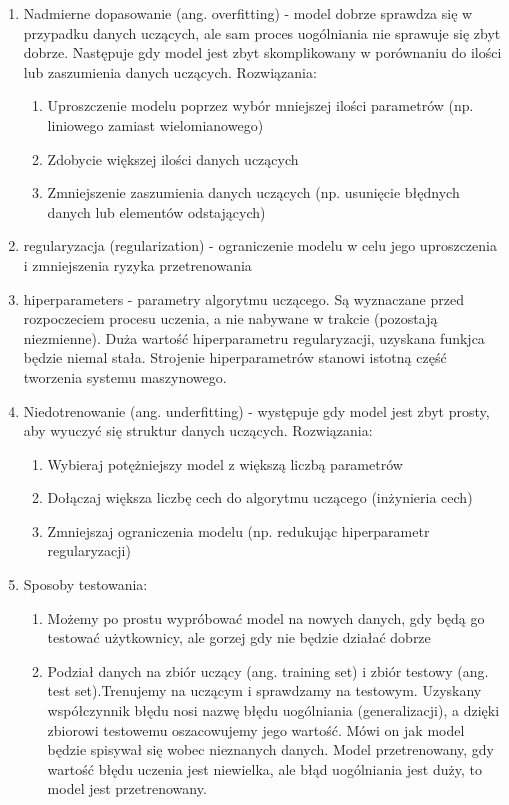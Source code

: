 \documentclass[polish,12pt,a4paper]{article}
\begin{document}
\begin{enumerate}
\begin{enumerate}
		\end{enumerate}
		\item Nadmierne dopasowanie (ang. overfitting) - model dobrze sprawdza się w przypadku danych uczących, ale sam proces uogólniania nie sprawuje się zbyt dobrze. Następuje gdy model jest zbyt skomplikowany w porównaniu do ilości lub zaszumienia danych uczących. Rozwiązania:
		\begin{enumerate}
			\item Uproszczenie modelu poprzez wybór mniejszej ilości parametrów (np. liniowego zamiast wielomianowego)
			\item Zdobycie większej ilości danych uczących
			\item Zmniejszenie zaszumienia danych uczących (np. usunięcie błędnych danych lub elementów odstających)
		\end{enumerate}
		\item regularyzacja (regularization) - ograniczenie modelu w celu jego uproszczenia i zmniejszenia ryzyka przetrenowania
		\item hiperparameters - parametry algorytmu uczącego. Są wyznaczane przed rozpoczeciem procesu uczenia, a nie nabywane w trakcie (pozostają niezmienne). Duża wartość hiperparametru regularyzacji, uzyskana funkjca będzie niemal stała. Strojenie hiperparametrów stanowi istotną część tworzenia systemu maszynowego.
		\item Niedotrenowanie (ang. underfitting) - występuje gdy model jest zbyt prosty, aby wyuczyć się struktur danych uczących. Rozwiązania:
		\begin{enumerate}
			\item Wybieraj potężniejszy model z większą liczbą parametrów
			\item Dołączaj większa liczbę cech do algorytmu uczącego (inżynieria cech)
			\item Zmniejszaj ograniczenia modelu (np. redukując hiperparametr regularyzacji)
		\end{enumerate}
		\item Sposoby testowania:
		\begin{enumerate}
			\item Możemy po prostu wypróbować model na nowych danych, gdy będą go testować użytkownicy, ale gorzej gdy nie będzie działać dobrze
			\item Podział danych na zbiór uczący (ang. training set) i zbiór testowy (ang. test set).Trenujemy na uczącym i sprawdzamy na testowym. Uzyskany współczynnik błędu nosi nazwę błędu uogólniania (generalizacji), a dzięki zbiorowi testowemu oszacowujemy jego wartość. Mówi on jak model będzie spisywał się wobec nieznanych danych. Model przetrenowany, gdy wartość błędu uczenia jest niewielka, ale błąd uogólniania jest duży, to model jest przetrenowany.

\end{enumerate}
\end{enumerate}
\end{document}
